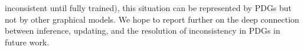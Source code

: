 \documentclass[letterpaper]{article} %
\theoremstyle{plain}
\theoremstyle{definition}
\theoremstyle{remark}
\begin{document}
inconsistent until fully trained), this situation
can be represented by PDGs but not
by other graphical models.
%
We hope to report further on the deep connection between
inference, updating, 
and the resolution of inconsistency in PDGs
in future work.

\end{document}
